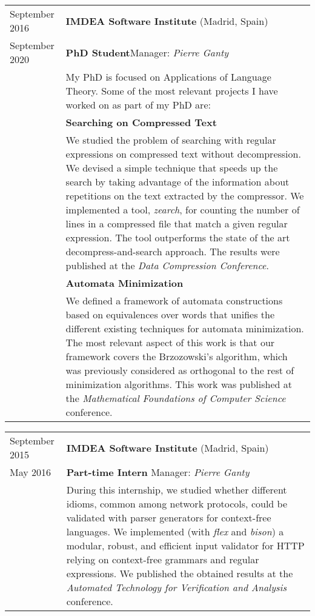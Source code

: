 \documentclass[a4paper,10pt]{article} %
\begin{document}
\begin{tabular}{p{2.5cm}p{13.2cm}}
{\small September 2016} & \textbf{IMDEA Software Institute} (Madrid, Spain) \\
{\small September 2020} & \textcolor{azureblue}{\textbf{PhD Student}}\hfill Manager: \emph{Pierre Ganty}\\

& My PhD is focused on Applications of Language Theory.
Some of the most relevant projects I have worked on as part of my PhD are:\\
[3pt]
& \textcolor{battleshipgrey}{\textbf{Searching on Compressed Text}} \\
& We studied the problem of searching with regular expressions on compressed text without decompression. We devised a simple technique that speeds up the search by taking advantage of the information about repetitions on the text extracted by the compressor.
We implemented a tool, \emph{zearch}, for counting the number of lines in a compressed file that match a given regular expression.
The tool outperforms the state of the art decompress-and-search approach.
The results were published at the \emph{Data Compression Conference}. \\
[3pt]
& \textcolor{battleshipgrey}{\textbf{Automata Minimization}} \\
& We defined a framework of automata constructions based on equivalences over words that unifies the different existing techniques for automata minimization.
The most relevant aspect of this work is that our framework covers the Brzozowski's algorithm, which was previously considered as orthogonal to the rest of minimization algorithms.
This work was published at the \emph{Mathematical Foundations of Computer Science} conference.
\end{tabular}

\begin{tabular}{p{2.5cm}p{13.2cm}}
{\small September 2015} & \textbf{IMDEA Software Institute} (Madrid, Spain) \\
{\small May 2016} & \textcolor{azureblue}{\textbf{Part-time Intern}} \hfill Manager: \emph{Pierre Ganty} \\
& During this internship, we studied whether different idioms, common among network protocols, could be validated with parser generators for context-free languages.
We implemented (with \emph{flex} and \emph{bison}) a modular, robust, and efficient input validator for HTTP relying on context-free grammars and regular expressions.
We published the obtained results at the \emph{Automated Technology for Verification and Analysis} conference.
\end{tabular}
\end{document}

